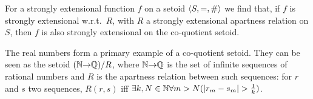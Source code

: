For a strongly extensional function $f$ on a setoid $\langle S,
=,\mathrel{\#}\rangle$ we find that, if $f$ is strongly extensional w.r.t.\
$R$, with $R$ a strongly extensional apartness relation on $S$, then
$f$ is also strongly extensional on the co-quotient setoid.

The real numbers form a primary example of a co-quotient setoid. They
can be seen as the setoid $(\mathbb{N} {\rightarrow} \mathbb{Q})/R$, where $\mathbb{N}{\rightarrow} \mathbb{Q}$ is
the set of infinite sequences of rational numbers and $R$ is the
apartness relation between such sequences: for $r$ and $s$ two
sequences, $R(r,s)$ iff $\exists k, N\in\mathbb{N}\forall m>N (|r_m - s_m| 
>\frac{1}{k})$.



